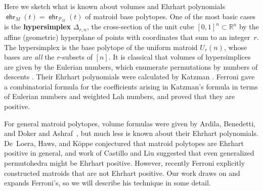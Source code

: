 \documentclass[11pt]{amsart}
\theoremstyle{definition}
\newcommand{\0}{\emptyset}
\newcommand{\R}{\mathbb{R}}
\newcommand{\Po}{\mathcal{P}}
\DeclareMathOperator{\ehr}{\mathsf{ehr}}
\newcommand{\defterm}[1]{\textbf{#1}}
\begin{document}
Here we sketch what is known about volumes and Ehrhart polynomials $\ehr_M(t)=\ehr_{\Po_M}(t)$ of matroid base polytopes.
One of the most basic cases is the \defterm{hypersimplex} $\Delta_{r,n}$, the cross-section of the unit cube $[0,1]^n\subset\R^n$ by the affine (geometric) hyperplane of points with coordinates that sum to an integer~$r$.  The hypersimplex is the base polytope of the uniform matroid $U_r(n)$, whose bases are \textit{all} the $r$-subsets of $[n]$.
It is classical that volumes of hypersimplices are given by the Eulerian numbers, which enumerate permutations by numbers of descents \cite[sequence A008292]{OEIS}.  Their Ehrhart polynomials were calculated by Katzman \cite[Cor.~2.2]{Katzman}.
Ferroni \cite[Thm.~4.3]{FerroniHypersimplices} gave a combinatorial formula for the coefficients arising in Katzman's formula in terms of Eulerian numbers and weighted Lah numbers, and proved that they are positive.

For general matroid polytopes, volume formulas were given by Ardila, Benedetti, and Doker \cite{ABD} and Ashraf~\cite{Ashraf}, but much less is known about their Ehrhart polynomials.
De~Loera, Haws, and K\"oppe \cite{DeLoeraHawsKoppe} conjectured that matroid polytopes are Ehrhart positive in general, and work of Castillo and Liu \cite{CastilloLiu} suggested that even generalized permutohedra might be Ehrhart positive.
However, recently Ferroni \cite{FerroniNotPositive} explicitly constructed matroids that are not Ehrhart positive.
Our work draws on and expands Ferroni's, so we will describe his technique in some detail.






\end{document}
